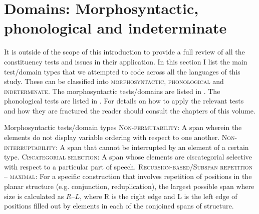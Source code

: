 \documentclass[output=paper,hidelinks]{langscibook}
\begin{document}








\section{Domains: Morphosyntactic, phonological and indeterminate}
\largerpage
\label{sec:domainsintroduction}

It is outside of the scope of this introduction to provide a full review of all the constituency tests and issues in their application. In this section I list the main test/domain types that we attempted to code across all the languages of this study. These can be classified into \textsc{morphosyntactic}, \textsc{phonological} and \textsc{indeterminate.}
The morphosyntactic tests/domains are listed in . The phonological tests are listed in . For details on how to apply the relevant tests and how they are fractured the reader should consult the chapters of this volume.


\ea Morphosyntactic tests/domain types \label{list:mstests}
    \ea  \textsc{Non-permutability}: A span wherein the elements do not display variable ordering with respect to one another.
        \ex \textsc{Non-interruptability}: A span that cannot be interrupted by an element of a certain type.
        \ex \textsc{Ciscategorial selection}: A span whose elements are ciscategorial selective with respect to a particular part of speech.
        \ex \textsc{Recursion-based/Subspan repetition -- maximal}: For a specific construction that involves repetition of positions in   the planar structure (e.g. conjunction, reduplication), the largest possible span where size is calculated as $\textit{R} – \textit{L}$, where R is the right edge and L is the left edge of positions filled out by elements in each of the conjoined spans of structure.
    \z
\z 
\end{document}

